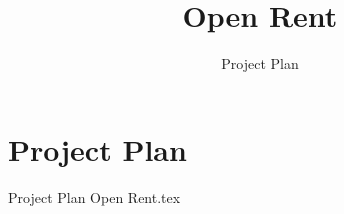 \documentclass[a4paper,11pt]{book}
\title{Open Rent}
\author{Project Plan}
\date{}
\begin{document}
\chapter{Project Plan}
{Project Plan Open Rent.tex}
\printglossary
\end{document}
